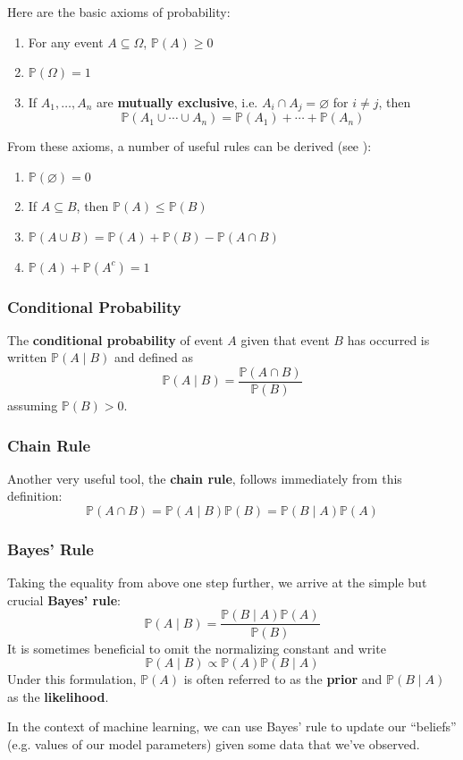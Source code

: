 \documentclass{article}
\newcommand{\pr}[1]{\mathbb{P}(#1)}
\newcommand{\term}[1]{\textbf{#1}}
\begin{document}
Here are the basic axioms of probability:
\begin{enumerate}
\item For any event $A \subseteq \Omega$, $\pr{A} \geq 0$
\item $\pr{\Omega} = 1$
\item If $A_1, \dots, A_n$ are \term{mutually exclusive}, i.e. $A_i \cap A_j = \varnothing$ for $i \neq j$, then
\[\pr{A_1 \cup \cdots \cup A_n} = \pr{A_1} + \cdots + \pr{A_n}\]
\end{enumerate}
From these axioms, a number of useful rules can be derived (see \cite{pitman}):
\begin{enumerate}
\item $\pr{\varnothing} = 0$
\item If $A \subseteq B$, then $\pr{A} \leq \pr{B}$
\item $\pr{A \cup B} = \pr{A} + \pr{B} - \pr{A \cap B}$
\item $\pr{A} + \pr{A^c} = 1$
\end{enumerate}

\subsubsection{Conditional Probability}
The \term{conditional probability} of event $A$ given that event $B$ has occurred is written $\pr{A \mid B}$ and defined as
\[\pr{A \mid B} = \frac{\pr{A \cap B}}{\pr{B}}\]
assuming $\pr{B} > 0$.

\subsubsection{Chain Rule}
Another very useful tool, the \term{chain rule}, follows immediately from this definition:
\[\pr{A \cap B} = \pr{A \mid B}\pr{B} = \pr{B \mid A}\pr{A}\]

\subsubsection{Bayes' Rule}
Taking the equality from above one step further, we arrive at the simple but crucial \term{Bayes' rule}:
\[\pr{A \mid B} = \frac{\pr{B \mid A}\pr{A}}{\pr{B}}\]
It is sometimes beneficial to omit the normalizing constant and write
\[\pr{A \mid B} \propto \pr{A}\pr{B \mid A}\]
Under this formulation, $\pr{A}$ is often referred to as the \term{prior} and $\pr{B \mid A}$ as the \term{likelihood}.

In the context of machine learning, we can use Bayes' rule to update our ``beliefs'' (e.g. values of our model parameters) given some data that we've observed.
\end{document}
